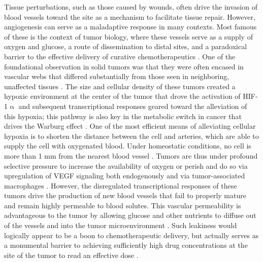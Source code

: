 Tissue perturbations, such as those caused by wounds, often drive the invasion of blood vessels toward the site as a mechanism to facilitate tissue repair. However, angiogenesis can serve as a maladaptive response in many contexts. Most famous of these is the context of tumor biology, where these vessels serve as a supply of oxygen and glucose, a route of dissemination to distal sites, and a paradoxical barrier to the effective delivery of curative chemotherapeutics \citep{Park2016, Yonucu2017, Fujita2017}. One of the foundational observation in solid tumors was that they were often encased in vascular webs that differed substantially from those seen in neighboring, unaffected tissues \citep{Chung2011}. The size and cellular density of these tumors created a hypoxic environment at the center of the tumor that drove the activation of HIF\hyp{}1$\upalpha$ and subsequent transcriptional responses geared toward the alleviation of this hypoxia; this pathway is also key in the metabolic switch in cancer that drives the Warburg effect \citep{Mesange2014, Masoud2015, Courtnay2015}. One of the most efficient means of alleviating cellular hypoxia is to shorten the distance between the cell and arteries, which are able to supply the cell with oxygenated blood. Under homeostatic conditions, no cell is more than 1 mm from the nearest blood vessel \citep{Weber2020}. Tumors are thus under profound selective pressure to increase the availability of oxygen or perish and do so via upregulation of VEGF signaling both endogenously and via tumor\hyp{}associated macrophages \citep{Napione2017, Riabov2014}. However, the disregulated transcriptional responses of these tumors drive the production of new blood vessels that fail to properly mature and remain highly permeable to blood solutes. This vascular permeability is advantageous to the tumor by allowing glucose and other nutrients to diffuse out of the vessels and into the tumor microenvironment \citep{Park2016}. Such leakiness would logically appear to be a boon to chemotherapeutic delivery, but actually serves as a monumental barrier to achieving sufficiently high drug concentrations at the site of the tumor to read an effective dose \citep{Datta2015, Goel2012, Yonucu2017}. 

